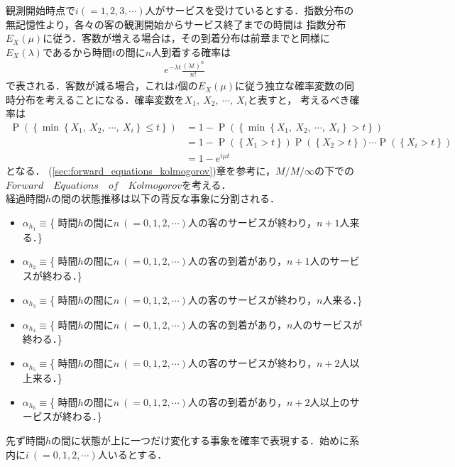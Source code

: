 \documentclass[a4j,papersize,disablejfam,slide,14pt]{jsarticle}
\def\min#1#2{\operatorname{min} \left\{ #1,\ #2 \right\}} %
\def\exp#1{e^{#1}} %
\def\prob#1{\operatorname{P} \left(\left\{ #1 \right\}\right)} %
\begin{document}
    観測開始時点で$i(=1,2,3,\cdots)$人がサービスを受けているとする．指数分布の無記憶性より，各々の客の観測開始からサービス終了までの時間は
    指数分布$E_X(\mu)$に従う．客数が増える場合は，その到着分布は前章までと同様に$E_X(\lambda)$であるから時間$t$の間に$n$人到着する確率は
    \begin{align}
    	\exp{-\lambda t} \frac{(\lambda t)^n}{n!}
    \end{align}
    で表される．客数が減る場合，これは$i$個の$E_X(\mu)$に従う独立な確率変数の同時分布を考えることになる．確率変数を$X_1,\ X_2,\ \cdots,\ X_i$と表すと，
    考えるべき確率は
    \begin{align}
    	\prob{ \min{X_1,\ X_2,\ \cdots}{X_i} \leq t } &= 1 - \prob{ \min{X_1,\ X_2,\ \cdots}{X_i} > t } \\
        &= 1 - \prob{X_1 > t}\prob{X_2 > t} \cdots \prob{X_i > t} \\
        &= 1 - \exp{i \mu t}
    \end{align}
    となる．
    (\ref{sec:forward_equations_kolmogorov})章を参考に，$M/M/\infty$の下での$Forward\quad Equations\quad of\quad Kolmogorov$を考える．\\
	経過時間$h$の間の状態推移は以下の背反な事象に分割される．
    \begin{itemize}
    	\item $\alpha_h_1 \equiv $\{ 時間$h$の間に$n\ (=0,1,2,\cdots)$人の客のサービスが終わり，$n+1$人来る．\}
        \item $\alpha_h_2 \equiv $\{ 時間$h$の間に$n\ (=0,1,2,\cdots)$人の客の到着があり，$n+1$人のサービスが終わる．\}
        \item $\alpha_h_3 \equiv $\{ 時間$h$の間に$n\ (=0,1,2,\cdots)$人の客のサービスが終わり，$n$人来る．\}
        \item $\alpha_h_4 \equiv $\{ 時間$h$の間に$n\ (=0,1,2,\cdots)$人の客の到着があり，$n$人のサービスが終わる．\}
        \item $\alpha_h_5 \equiv $\{ 時間$h$の間に$n\ (=0,1,2,\cdots)$人の客のサービスが終わり，$n+2$人以上来る．\}
        \item $\alpha_h_6 \equiv $\{ 時間$h$の間に$n\ (=0,1,2,\cdots)$人の客の到着があり，$n+2$人以上のサービスが終わる．\}
    \end{itemize}
    先ず時間$h$の間に状態が上に一つだけ変化する事象を確率で表現する．始めに系内に$i\ (=0,1,2,\cdots)$人いるとする．
\end{document}
